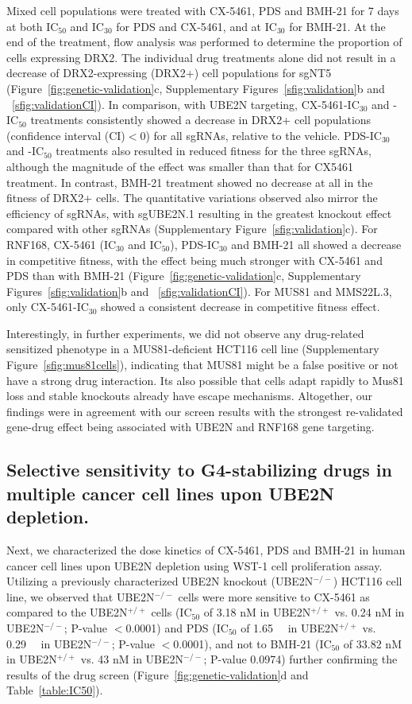 Mixed cell populations were treated with CX-5461, PDS and BMH-21 for 7 days at both IC$_{50}$ and IC$_{30}$ for PDS and CX-5461, and at IC$_{30}$ for BMH-21. 
At the end of the treatment, flow analysis was performed to determine the proportion of cells expressing DRX2. 
The individual drug treatments alone did not result in a decrease of DRX2-expressing (DRX2+) cell populations for sgNT5 (Figure~\ref{fig:genetic-validation}c, Supplementary Figures~\ref{sfig:validation}b and ~\ref{sfig:validationCI}). 
In comparison, with UBE2N targeting, CX-5461-IC$_{30}$ and -IC$_{50}$ treatments consistently showed a decrease in DRX2+ cell populations (confidence interval (CI)$<$0) for all sgRNAs, relative to the vehicle. 
PDS-IC$_{30}$ and -IC$_{50}$ treatments also resulted in reduced fitness for the three sgRNAs, although the magnitude of the effect was smaller than that for CX5461 treatment.
In contrast, BMH-21 treatment showed no decrease at all in the fitness of DRX2+ cells.
The quantitative variations observed also mirror the efficiency of sgRNAs, with sgUBE2N.1 resulting in the greatest knockout effect compared with other sgRNAs (Supplementary Figure~\ref{sfig:validation}c).
For RNF168, CX-5461 (IC$_{30}$ and IC$_{50}$), PDS-IC$_{30}$ and BMH-21 all showed a decrease in competitive fitness, with the effect being much stronger with CX-5461 and PDS than with BMH-21 (Figure~\ref{fig:genetic-validation}c, Supplementary Figures~\ref{sfig:validation}b and ~\ref{sfig:validationCI}). 
For MUS81 and MMS22L.3, only CX-5461-IC$_{30}$ showed a consistent decrease in competitive fitness effect.

Interestingly, in further experiments, we did not observe any drug-related sensitized phenotype in a MUS81-deficient HCT116 cell line (Supplementary Figure~\ref{sfig:mus81cells}), indicating that MUS81 might be a false positive or not have a strong drug interaction. 
Its also possible that cells adapt rapidly to Mus81 loss and stable knockouts already have escape mechanisms. 
Altogether, our findings were in agreement with our screen results with the strongest re-validated gene-drug effect being associated with UBE2N and RNF168 gene targeting. 

\subsection{Selective sensitivity to G4-stabilizing drugs in multiple cancer cell lines upon UBE2N depletion.}
Next, we characterized the dose kinetics of CX-5461, PDS and BMH-21 in human cancer cell lines upon UBE2N depletion using WST-1 cell proliferation assay. 
Utilizing a previously characterized UBE2N knockout (UBE2N$^{-/-}$) HCT116 cell line\cite{Thorslund2015}, we observed that UBE2N$^{-/-}$ cells were more sensitive to CX-5461 as compared to the UBE2N$^{+/+}$ cells (IC$_{50}$ of 3.18 nM in UBE2N$^{+/+}$ vs. 0.24 nM in UBE2N$^{-/-}$; P-value $<$0.0001) and PDS (IC$_{50}$ of \SI{1.65}{\micro\Molar} in UBE2N$^{+/+}$ vs. \SI{0.29}{\micro\Molar} in UBE2N$^{-/-}$; P-value $<$0.0001), and not to BMH-21 (IC$_{50}$ of 33.82 nM in UBE2N$^{+/+}$ vs. 43 nM in UBE2N$^{-/-}$; P-value 0.0974) further confirming the results of the drug screen (Figure~\ref{fig:genetic-validation}d and Table~\ref{table:IC50}).

